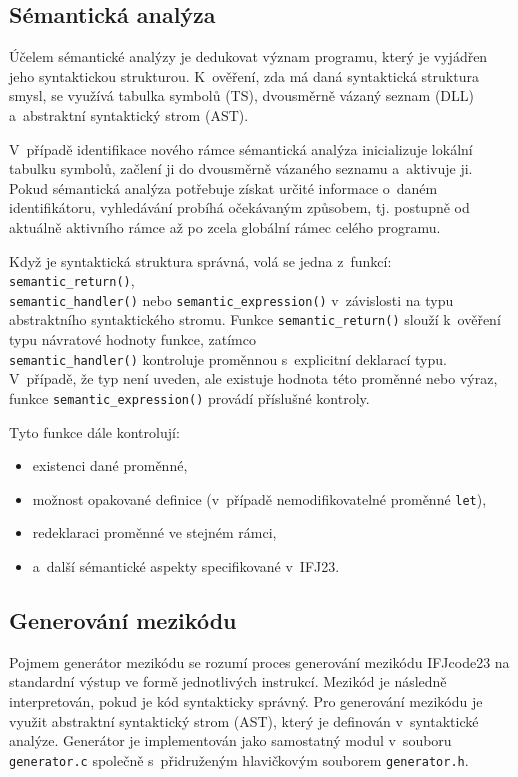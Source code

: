 \documentclass[a4paper, 11pt]{article}
\begin{document}
\subsection{Sémantická analýza}
    Účelem sémantické analýzy je dedukovat význam programu, který je vyjádřen jeho syntaktickou strukturou.
    K~ověření, zda má daná syntaktická struktura smysl, se využívá tabulka symbolů (TS), dvousměrně vázaný seznam (DLL) a~abstraktní syntaktický strom (AST).

    V~případě identifikace nového rámce sémantická analýza inicializuje lokální tabulku symbolů, začlení ji do dvousměrně vázaného seznamu a~aktivuje ji.
    Pokud sémantická analýza potřebuje získat určité informace o~daném identifikátoru, vyhledávání probíhá očekávaným způsobem, tj. postupně od aktuálně aktivního rámce až po zcela globální rámec celého programu.

    Když je syntaktická struktura správná, volá se jedna z~funkcí: \texttt{semantic\_return()}, \\ \texttt{semantic\_handler()} nebo \texttt{semantic\_expression()} v~závislosti na typu abstraktního syntaktického stromu.
    Funkce \texttt{semantic\_return()} slouží k~ověření typu návratové hodnoty funkce, zatímco \\ \texttt{semantic\_handler()} kontroluje proměnnou s~explicitní deklarací typu.
    V~případě, že typ není uveden, ale existuje hodnota této proměnné nebo výraz, funkce \texttt{semantic\_expression()} provádí příslušné kontroly.

    Tyto funkce dále kontrolují:
    \begin{itemize}
        \item existenci dané proměnné,
        \item možnost opakované definice (v~případě nemodifikovatelné proměnné \texttt{let}),
        \item redeklaraci proměnné ve stejném rámci,
        \item a~další sémantické aspekty specifikované v~IFJ23.
    \end{itemize}


\subsection{Generování mezikódu}
    Pojmem generátor mezikódu se rozumí proces generování mezikódu IFJcode23 na standardní výstup ve formě jednotlivých instrukcí.
    Mezikód je následně interpretován, pokud je kód syntakticky správný.
    Pro generování mezikódu je využit abstraktní syntaktický strom (AST), který je definován v~syntaktické analýze.
    Generátor je implementován jako samostatný modul v~souboru \texttt{generator.c} společně s~přidruženým hlavičkovým souborem \texttt{generator.h}.
\end{document}
